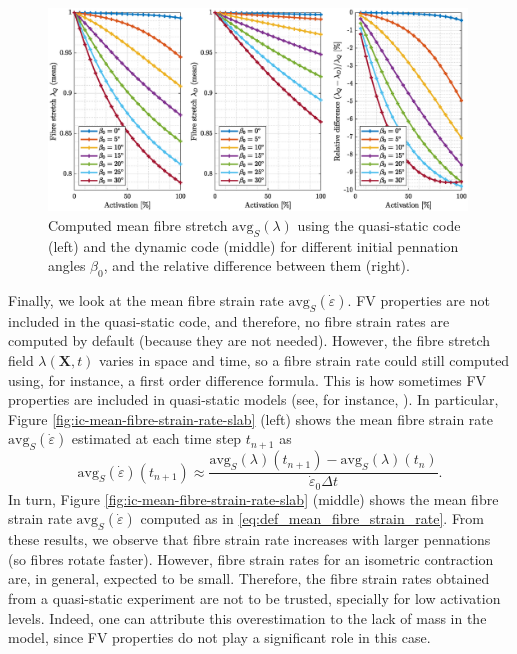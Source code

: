 \documentclass{sfuthesis}
\numberwithin{equation}{section}
\numberwithin{figure}{chapter}
\numberwithin{table}{chapter}
\theoremstyle{definition}
\def\*#1{{\mathbf{#1}}} %
\newcommand{\depsilon}{\dot{\varepsilon}}
\begin{document}
\begin{figure}
    \centering
    \includegraphics[width=0.99\textwidth]{ic-mean-fibre-stretch-slab.eps}
    \caption{Computed mean fibre stretch $\mathrm{avg}_S(\lambda)$ using the quasi-static code (left) and the dynamic code (middle) for different initial pennation angles $\beta_0$, and the relative difference between them (right).
    \label{fig:ic-mean-fibre-stretch-slab}}
\end{figure}

Finally, we look at the mean fibre strain rate $\mathrm{avg}_S(\depsilon)$. FV properties are not included in the quasi-static code, and therefore, no fibre strain rates are computed by default (because they are not needed). However, the fibre stretch field $\lambda(\*X,t)$ varies in space and time, so a fibre strain rate could still computed using, for instance, a first order difference formula. This is how sometimes FV properties are included in quasi-static models (see, for instance, \cite{DiSalvoBlemker2024}). In particular, Figure \ref{fig:ic-mean-fibre-strain-rate-slab} (left) shows the mean fibre strain rate $\mathrm{avg}_S(\depsilon)$ estimated at each time step $t_{n+1}$ as
\begin{equation}
    \mathrm{avg}_S(\depsilon)(t_{n+1}) \approx \dfrac{\mathrm{avg}_S(\lambda)(t_{n+1}) - \mathrm{avg}_S(\lambda)(t_{n})}{\depsilon_0 \Delta t}.
\end{equation}
In turn, Figure \ref{fig:ic-mean-fibre-strain-rate-slab} (middle) shows the mean fibre strain rate $\mathrm{avg}_S(\depsilon)$ computed as in \eqref{eq:def_mean_fibre_strain_rate}. From these results, we observe that fibre strain rate increases with larger pennations (so fibres rotate faster). However, fibre strain rates for an isometric contraction are, in general, expected to be small. Therefore, the fibre strain rates obtained from a quasi-static experiment are not to be trusted, specially for low activation levels. Indeed, one can attribute this overestimation to the lack of mass in the model, since FV properties do not play a significant role in this case.
\end{document}
